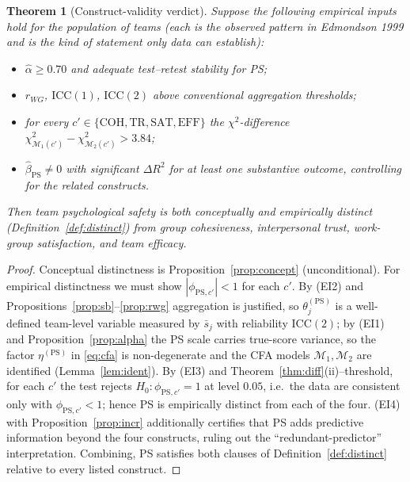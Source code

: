 \documentclass{amsart}
\newtheorem{theorem}{Theorem}
\theoremstyle{remark}
\begin{document}
\begin{theorem}[Construct-validity verdict]\label{thm:verdict}
Suppose the following empirical inputs hold for the population of teams (each is the
observed pattern in Edmondson 1999 and is the kind of statement only data can
establish):
\begin{itemize}
\item[(EI1)] $\hat\alpha\ge0.70$ and adequate test--retest stability for PS;
\item[(EI2)] $r_{WG}$, $\mathrm{ICC}(1)$, $\mathrm{ICC}(2)$ above conventional
aggregation thresholds;
\item[(EI3)] for every $c'\in\{\mathrm{COH,TR,SAT,EFF}\}$ the $\chi^2$-difference
$\chi^2_{\mathcal M_1(c')}-\chi^2_{\mathcal M_2(c')}>3.84$;
\item[(EI4)] $\hat\beta_{\mathrm{PS}}\neq0$ with significant $\Delta R^2$ for at
least one substantive outcome, controlling for the related constructs.
\end{itemize}
Then team psychological safety is \emph{both conceptually and empirically distinct}
(Definition~\ref{def:distinct}) from group cohesiveness, interpersonal trust,
work-group satisfaction, and team efficacy.
\end{theorem}
\begin{proof}
Conceptual distinctness is Proposition~\ref{prop:concept} (unconditional). For
empirical distinctness we must show $|\phi_{\mathrm{PS},c'}|<1$ for each $c'$.
By (EI2) and Propositions~\ref{prop:sb}--\ref{prop:rwg} aggregation is justified, so
$\theta^{(\mathrm{PS})}_j$ is a well-defined team-level variable measured by
$\bar s_j$ with reliability $\mathrm{ICC}(2)$; by (EI1) and
Proposition~\ref{prop:alpha} the PS scale carries true-score variance, so the
factor $\eta^{(\mathrm{PS})}$ in \eqref{eq:cfa} is non-degenerate and the CFA models
$\mathcal M_1,\mathcal M_2$ are identified (Lemma~\ref{lem:ident}). By (EI3) and
Theorem~\ref{thm:diff}(ii)--threshold, for each $c'$ the test rejects
$H_0:\phi_{\mathrm{PS},c'}=1$ at level $0.05$, i.e.\ the data are consistent only
with $\phi_{\mathrm{PS},c'}<1$; hence PS is empirically distinct from each of the
four. (EI4) with Proposition~\ref{prop:incr} additionally certifies that PS adds
predictive information beyond the four constructs, ruling out the
``redundant-predictor'' interpretation. Combining, PS satisfies both clauses of
Definition~\ref{def:distinct} relative to every listed construct. \end{proof}
\end{document}
